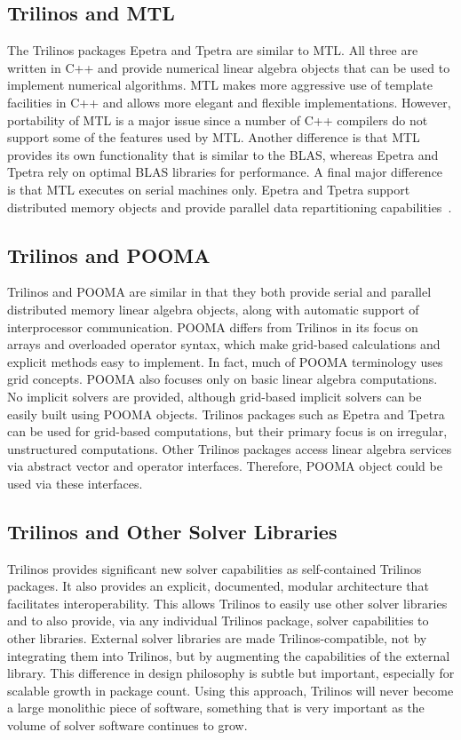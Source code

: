 \documentclass[acmtoms,acmnow]{acmtrans2m}
\begin{document}
\subsection{Trilinos and MTL}
The Trilinos packages Epetra and Tpetra are similar to MTL.  All three
are written in C++ and provide numerical linear algebra objects
that can be used to implement numerical algorithms.  MTL
makes more aggressive use of template facilities in C++ and allows
more elegant and flexible implementations.  However, portability of
MTL is a major issue since a number of C++ compilers do not 
support some of
the features used by MTL.  Another difference is that MTL provides its
own functionality that is similar to the BLAS, whereas Epetra and
Tpetra rely on optimal BLAS libraries for performance.  A final
major difference is that MTL executes on serial machines only.  
Epetra and Tpetra support distributed
memory objects and provide parallel data repartitioning
capabilities~\cite{Repartitioning}.

\subsection{Trilinos and POOMA}

Trilinos and POOMA are similar in that they both provide serial and parallel
distributed memory linear algebra objects, along with automatic support of
interprocessor communication.   POOMA differs from Trilinos in its
focus on arrays and overloaded operator syntax, which make
grid-based calculations and explicit methods easy to implement.  In
fact, much of POOMA terminology uses grid concepts.  POOMA also focuses
only on basic linear algebra computations.  No implicit solvers are
provided, although grid-based implicit solvers can be easily built
using POOMA objects.
Trilinos packages such as Epetra and Tpetra can be used for grid-based
computations, but their primary focus is on
irregular, unstructured computations.  Other Trilinos packages access
linear algebra services via abstract vector and operator interfaces.
Therefore, POOMA object could be used via these interfaces. 

\subsection{Trilinos and Other Solver Libraries}
Trilinos provides significant new solver capabilities as 
self-contained Trilinos packages.  It also provides an explicit,
documented, modular architecture that 
facilitates interoperability.  This allows Trilinos to easily use
other solver libraries and to also provide, via any individual Trilinos
package, solver capabilities to other libraries. External solver
libraries are made Trilinos-compatible, not by integrating them into
Trilinos, but by augmenting the capabilities of the external library.
This difference in design philosophy is subtle but important,
especially for scalable growth in package count.  Using this approach,
Trilinos will never become a large monolithic piece of software,
something that is very important as the volume of solver software
continues to grow.
\end{document}
